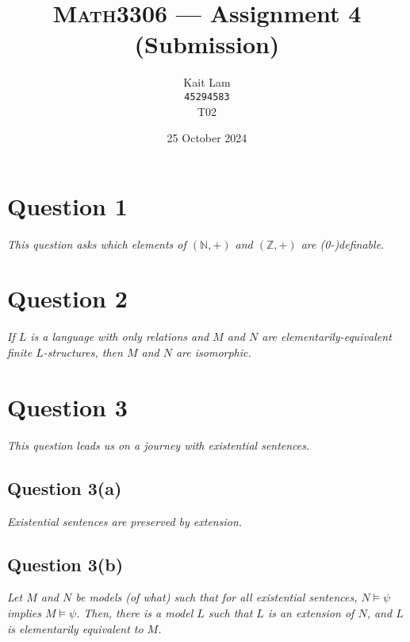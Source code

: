 \documentclass[a4paper]{article}
\author{Kait Lam \\ \small \texttt{45294583} \\ \small {T02}}
\title{\textsc{Math3306} --- Assignment 4 (Submission)}
\date{25 October 2024}
\begin{document}
\maketitle


\section*{Question 1}
\begin{center}
  \textit{This question asks which elements of $(\mathbb N, +)$ and $(\mathbb Z, +)$ are (0-)definable.}
\end{center}

\section*{Question 2}
\begin{center}
  \textit{If $L$ is a language with only relations and $M$ and $N$ are
  elementarily-equivalent finite $L$-structures, then $M$ and $N$ are isomorphic.}
\end{center}

\section*{Question 3}
\begin{center}
  \textit{This question leads us on a journey with existential sentences.}
\end{center}
\subsection*{Question 3(a)}
\begin{center}
  \textit{Existential sentences are preserved by extension.}
\end{center}
\subsection*{Question 3(b)}
\begin{center}
  \textit{Let $M$ and $N$ be models (of what) such that for all existential sentences, $N \models \psi$ implies $M \models \psi$.
  Then, there is a model $L$ such that $L$ is an extension of $N$, and $L$ is elementarily equivalent to $M$.}
\end{center}
\end{document}
